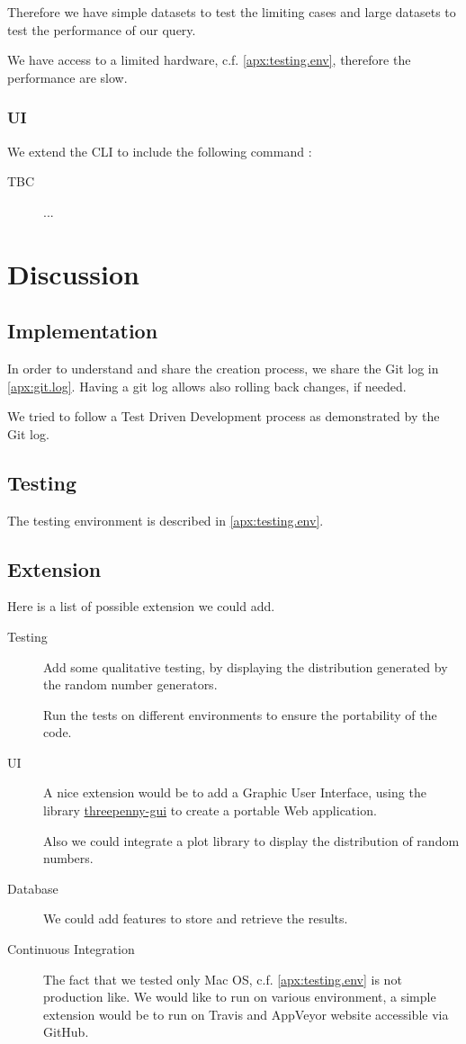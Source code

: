 \documentclass[12pt,a4paper,article]{memoir} %
\begin{document}
Therefore we have simple datasets to test the limiting cases and 
large datasets to test the performance of our query.

We have access to a limited hardware, c.f. \autoref{apx:testing.env}, 
therefore the performance are slow.

\subsection{UI}
We extend the CLI to include the following command :
\begin{description}
	\item[TBC] ...
\end{description}

\newpage
\chapter{Discussion}
\section{Implementation}
In order to understand and share the creation process, 
we share the Git log in \autoref{apx:git.log}. 
Having a git log allows also rolling back changes, if needed.

We tried to follow a Test Driven Development process as 
demonstrated by the Git log.

\section{Testing}
The testing environment is described in \autoref{apx:testing.env}.

\section{Extension}
Here is a list of possible extension we could add.
\begin{description}
	\item [Testing]
	Add some qualitative testing, by displaying the distribution generated 
	by the random number generators.
	
	Run the tests on different environments to ensure the portability of 
	the code.
	\item [UI] 
	A nice extension would be to add a Graphic User Interface,
	using the library 
	\href{https://hackage.haskell.org/package/threepenny-gui}{threepenny-gui}
	to create a portable Web application.
	
	Also we could integrate a plot library to display the distribution of 
	random numbers.
	\item[Database]
	We could add features to store and retrieve the results.
	\item[Continuous Integration]
	The fact that we tested only Mac OS, c.f. \autoref{apx:testing.env} is 
	not production like.
	We would like to run on various environment, a simple extension would 
	be to run on Travis and AppVeyor website accessible via GitHub.
\end{description}
\end{document}
